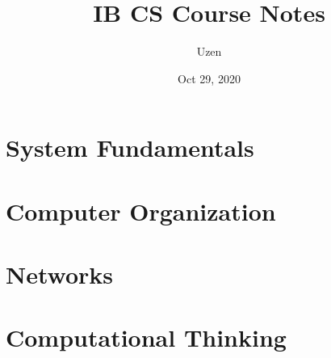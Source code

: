 \documentclass{report}
\title{IB CS Course Notes}
\author{Uzen}
\date{Oct 29, 2020}
\begin{document}
\maketitle
\tableofcontents

\newpage

\chapter{System Fundamentals}


\chapter{Computer Organization}


\chapter{Networks}


\chapter{Computational Thinking}

\end{document}
